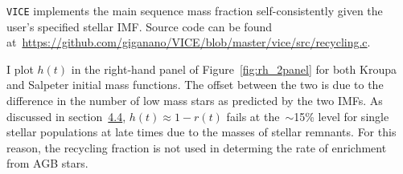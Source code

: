 \documentclass{report}
\begin{document}
\par
\texttt{VICE} implements the main sequence mass fraction self-consistently 
given the user's specified stellar IMF. Source code can be found 
at~\url{https://github.com/giganano/VICE/blob/master/vice/src/recycling.c}. 
\par
I plot $h(t)$ in the right-hand panel of Figure~\ref{fig:rh_2panel} for 
both Kroupa and Salpeter initial mass functions. The offset between the two is 
due to the difference in the number of low mass stars as predicted by the 
two IMFs. As discussed in section~\hyperlink{enrichment:agb}{4.4}, 
$h(t) \approx 1 - r(t)$ fails at the~$\sim$15\% level for single stellar 
populations at late times due to the masses of stellar remnants. For this 
reason, the recycling fraction is not used in determing the rate of enrichment 
from AGB stars. 
\end{document}
